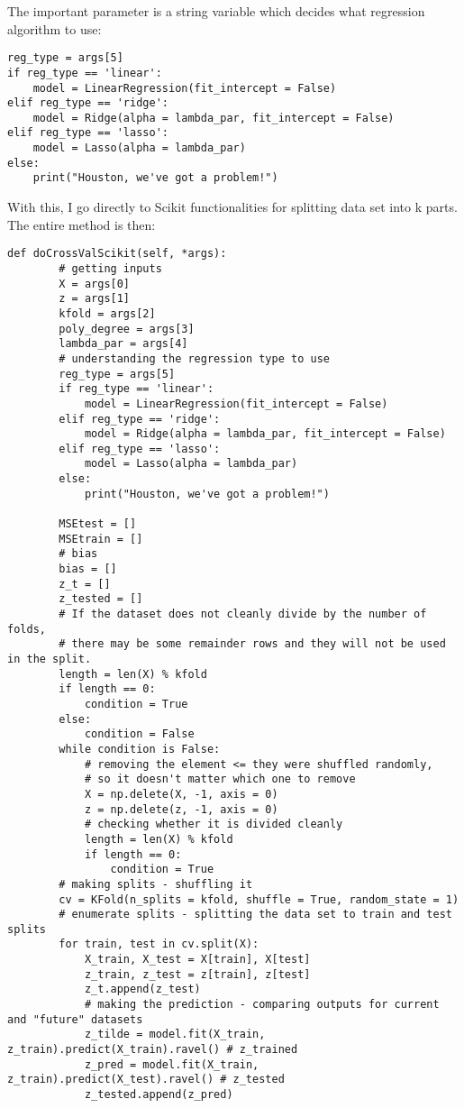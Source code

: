 The important parameter is a string variable which decides what regression algorithm to use:
\begin{lstlisting}
reg_type = args[5]
if reg_type == 'linear':
    model = LinearRegression(fit_intercept = False)
elif reg_type == 'ridge':
    model = Ridge(alpha = lambda_par, fit_intercept = False)
elif reg_type == 'lasso':
    model = Lasso(alpha = lambda_par)
else:
    print("Houston, we've got a problem!")
\end{lstlisting}
With this, I go directly to Scikit functionalities for splitting data set into k parts. The entire method is then:
\begin{lstlisting}
def doCrossValScikit(self, *args):
        # getting inputs
        X = args[0]
        z = args[1]
        kfold = args[2]
        poly_degree = args[3]
        lambda_par = args[4]
        # understanding the regression type to use
        reg_type = args[5]
        if reg_type == 'linear':
            model = LinearRegression(fit_intercept = False)
        elif reg_type == 'ridge':
            model = Ridge(alpha = lambda_par, fit_intercept = False)
        elif reg_type == 'lasso':
            model = Lasso(alpha = lambda_par)
        else:
            print("Houston, we've got a problem!")

        MSEtest = []
        MSEtrain = []
        # bias
        bias = []
        z_t = []
        z_tested = []
        # If the dataset does not cleanly divide by the number of folds,
        # there may be some remainder rows and they will not be used in the split.
        length = len(X) % kfold
        if length == 0:
            condition = True
        else:
            condition = False
        while condition is False:
            # removing the element <= they were shuffled randomly,
            # so it doesn't matter which one to remove
            X = np.delete(X, -1, axis = 0)
            z = np.delete(z, -1, axis = 0)
            # checking whether it is divided cleanly
            length = len(X) % kfold
            if length == 0:
                condition = True
        # making splits - shuffling it
        cv = KFold(n_splits = kfold, shuffle = True, random_state = 1)
        # enumerate splits - splitting the data set to train and test splits
        for train, test in cv.split(X):
            X_train, X_test = X[train], X[test]
            z_train, z_test = z[train], z[test]
            z_t.append(z_test)
            # making the prediction - comparing outputs for current and "future" datasets
            z_tilde = model.fit(X_train, z_train).predict(X_train).ravel() # z_trained
            z_pred = model.fit(X_train, z_train).predict(X_test).ravel() # z_tested
            z_tested.append(z_pred)


\end{lstlisting}
